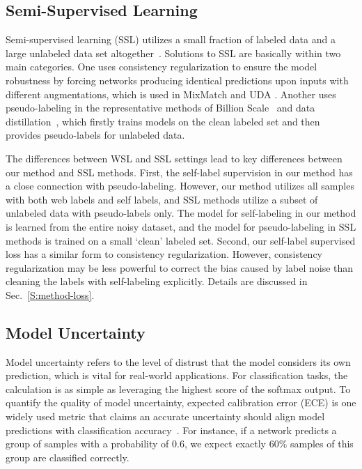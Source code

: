\documentclass[runningheads]{llncs}
\begin{document}
\subsection{Semi-Supervised Learning}
Semi-supervised learning (SSL) utilizes a small fraction of labeled data and a large unlabeled data set altogether~\cite{zhu2005semi}. 
Solutions to SSL are basically within two main categories. 
One uses consistency regularization to ensure the model robustness by forcing networks producing identical predictions upon inputs with different augmentations, which is used in MixMatch \cite{berthelot2019mixmatch} and UDA \cite{xie2019unsupervised}. 
Another uses pseudo-labeling in the representative methods of Billion Scale~\cite{yalniz2019billion} and data distillation~\cite{radosavovic2018data}, which firstly trains models on the clean labeled set and then provides pseudo-labels for unlabeled data. 

The differences between WSL and SSL settings lead to key differences between our method and SSL methods. First, the self-label supervision in our method has a close connection with pseudo-labeling. However, our method utilizes all samples with both web labels and self labels, and SSL methods utilize a subset of unlabeled data with pseudo-labels only. The model for self-labeling in our method is learned from the entire noisy dataset, and the model for pseudo-labeling in SSL methods is trained on a small `clean' labeled set. Second, our self-label supervised loss has a similar form to consistency regularization. However, consistency regularization may be less powerful to correct the bias caused by label noise than cleaning the labels with self-labeling explicitly.
Details are discussed in Sec.~\ref{S:method-loss}.
	
\subsection{Model Uncertainty}
Model uncertainty refers to the level of distrust that the model considers its own prediction, which is vital for real-world applications. For classification tasks, the calculation is as simple as leveraging the highest score of the softmax output. To quantify the quality of model uncertainty, expected calibration error (ECE) is one widely used metric that claims an accurate uncertainty should align model predictions with classification accuracy~\cite{guo2017calibration,ovadia2019can}. For instance, if a network predicts a group of samples with a probability of $0.6$, we expect exactly $60\%$ samples of this group are classified correctly.
\end{document}
